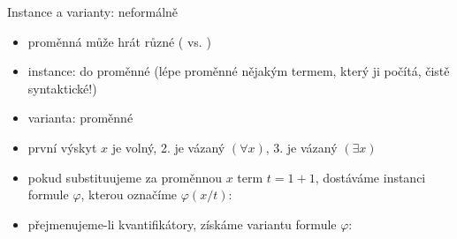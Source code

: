 \documentclass{beamer}
\begin{document}
\begin{frame}{Instance a varianty: neformálně}

    \begin{itemize}
        \item proměnná může hrát různé  ( vs. )
        \item \alert{instance}:  do  proměnné (lépe  proměnné nějakým termem, který ji počítá, čistě syntaktické!)
        \item \alert{varianta}:   proměnné
    \end{itemize}
    

    \begin{itemize}
        \item první výskyt $x$ je volný, 2. je vázaný $(\forall x)$, 3. je vázaný  $(\exists x)$
        \item pokud \alert{substituujeme} za proměnnou $x$ term $t=1+1$, dostáváme \alert{instanci} formule $\varphi$, kterou označíme \alert{$\varphi(x/t)$}:
        \item přejmenujeme-li kvantifikátory, získáme \alert{variantu} formule $\varphi$:
    \end{itemize}


\end{frame}
\end{document}
